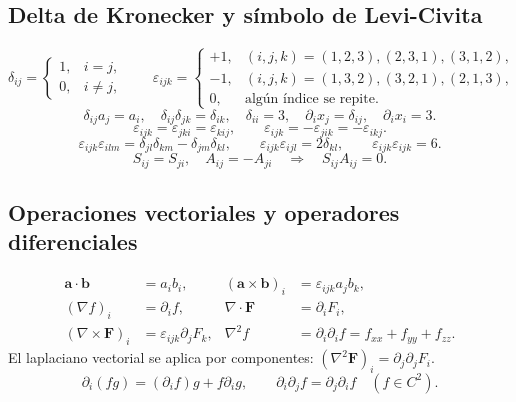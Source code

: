 \subsection*{Delta de Kronecker y símbolo de Levi-Civita}
\[
\delta_{ij}=\begin{cases}1,&i=j,\\0,&i\ne j,\end{cases}\qquad
\varepsilon_{ijk}=\begin{cases}
+1,&(i,j,k)=(1,2,3),(2,3,1),(3,1,2),\\
-1,&(i,j,k)=(1,3,2),(3,2,1),(2,1,3),\\
0,&\text{algún índice se repite}.
\end{cases}
\]
\[
\delta_{ij}a_j=a_i,\quad \delta_{ij}\delta_{jk}=\delta_{ik},\quad
\delta_{ii}=3,\quad \partial_i x_j=\delta_{ij},\quad \partial_i x_i=3.
\]
\[
\varepsilon_{ijk}=\varepsilon_{jki}=\varepsilon_{kij},\qquad
\varepsilon_{ijk}=-\varepsilon_{jik}=-\varepsilon_{ikj}.
\]
\[
\varepsilon_{ijk}\varepsilon_{ilm}=\delta_{jl}\delta_{km}-\delta_{jm}\delta_{kl},
\qquad \varepsilon_{ijk}\varepsilon_{ijl}=2\delta_{kl},\qquad
\varepsilon_{ijk}\varepsilon_{ijk}=6.
\]
\[
S_{ij}=S_{ji},\quad A_{ij}=-A_{ji}\quad\Longrightarrow\quad S_{ij}A_{ij}=0.
\]

\subsection*{Operaciones vectoriales y operadores diferenciales}
\begin{align*}
\mathbf a\cdot\mathbf b&=a_ib_i,&
(\mathbf a\times\mathbf b)_i&=\varepsilon_{ijk}a_jb_k,\\
(\nabla f)_i&=\partial_i f,&
\nabla\cdot\mathbf F&=\partial_iF_i,\\
(\nabla\times\mathbf F)_i&=\varepsilon_{ijk}\partial_jF_k,&
\nabla^2f&=\partial_i\partial_i f=f_{xx}+f_{yy}+f_{zz}.
\end{align*}
El laplaciano vectorial se aplica por componentes:
$(\nabla^2\mathbf F)_i=\partial_j\partial_jF_i$.
\[
\partial_i(fg)=(\partial_i f)g+f\partial_i g,\qquad
\partial_i\partial_jf=\partial_j\partial_if\quad(f\in C^2).
\]

